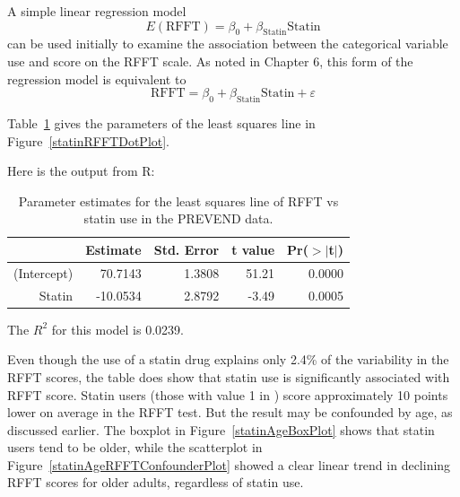 A simple linear regression model
\[
   E(\text{RFFT}) = \beta_0 + \beta_{\text{Statin}}\text{Statin}
   \label{RFFTStatinModel}
\]
can be used initially to examine the association between the categorical variable  use and score on the RFFT scale.  As noted in Chapter 6, this form of the regression model is equivalent to 
\[
   \text{RFFT} = \beta_0 + \beta_{\text{Statin}}\text{Statin} + \varepsilon
\]

Table~\ref{RFFTStatinRegression} gives the parameters of the least squares line in Figure~\ref{statinRFFTDotPlot}.

Here is the output from \textsf{R}:

\begin{table}[ht]
\centering
\begin{tabular}{rrrrr}
  \hline
 & Estimate & Std. Error & t value & Pr($>$$|$t$|$) \\ 
  \hline
(Intercept) & 70.7143 & 1.3808 & 51.21 & 0.0000 \\ 
  Statin & -10.0534 & 2.8792 & -3.49 & 0.0005 \\ 
   \hline
\end{tabular}
\caption{Parameter estimates for the least squares line of RFFT vs statin use in the PREVEND data.}
\label{RFFTStatinRegression}
\end{table} 
The $R^2$ for this model is 0.0239.
 
Even though the use of a statin drug explains only 2.4\% of the variability in the RFFT scores, the table does show that statin use is significantly associated with RFFT score. Statin users (those with value 1 in ) score approximately 10 points lower on average in the RFFT test.  But the result may be confounded by age, as discussed earlier.   The boxplot in Figure~\ref{statinAgeBoxPlot} shows that statin users tend to be older, while the scatterplot in Figure~\ref{statinAgeRFFTConfounderPlot} showed a clear linear trend in declining RFFT scores for older adults, regardless of statin use. 
 
